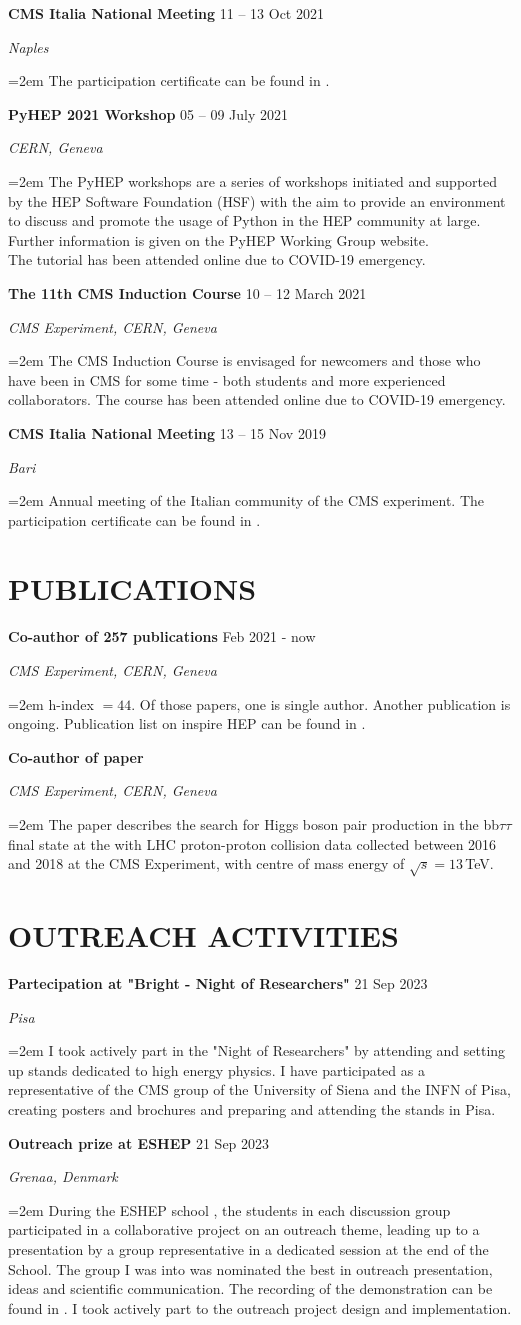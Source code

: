 \documentclass[paper=a4,fontsize=12pt]{article} %
\newcommand{\sepspacesmall}{\vspace*{0.3em}}
\newcommand{\NewPart}[1]{\section*{\uppercase{#1}}}
\newcommand{\EducationEntry}[4]{
	\noindent \textbf{#1} \hfill      %
	{#2} \par  %
	\noindent \textit{#3} \par        %
	\noindent\hangindent=2em\hangafter=0 \small #4 %
	\normalsize \par}
\begin{document}
	\sepspacesmall
	\EducationEntry{CMS Italia National Meeting}{11 -- 13 Oct 2021}{Naples}{The participation certificate can be found in \cite{CMS_it2021}.} 
	\sepspacesmall
	\EducationEntry{PyHEP 2021 Workshop}{05 -- 09 July 2021}{CERN, Geneva}{The PyHEP workshops are a series of workshops initiated and supported by the HEP Software Foundation (HSF) with the aim to provide an environment to discuss and promote the usage of Python in the HEP community at large. Further information is given on the PyHEP Working Group website.\\ The tutorial has been attended online due to COVID-19 emergency. \cite{pyHEP}}
	\sepspacesmall
	\EducationEntry{The 11th CMS Induction Course}{10 -- 12 March 2021}{CMS Experiment, CERN, Geneva}{The CMS Induction Course is envisaged for newcomers and those who have been in CMS for some time - both students and more experienced collaborators. The course has been attended online due to COVID-19 emergency. \cite{induction} }
	\sepspacesmall
	\EducationEntry{CMS Italia National Meeting}{13 -- 15 Nov 2019}{Bari}{Annual meeting of the Italian community of the CMS experiment. The participation certificate can be found in \cite{CMSit_2019}.} 
	\sepspacesmall
	\NewPart{Publications}{} 
    \EducationEntry{Co-author of 257 publications}{Feb 2021 - now}{CMS Experiment, CERN, Geneva}{h-index $=44$. Of those papers, one is single author. Another publication is ongoing. Publication list on inspire HEP can be found in \cite{publications}. \\}
     \sepspacesmall
    \EducationEntry{Co-author of paper}{ }{CMS Experiment, CERN, Geneva}{The paper describes the search for Higgs boson pair production in the bb$\tau\tau$ final state at the with LHC proton-proton collision data collected between 2016 and 2018 at the CMS Experiment, with centre of mass energy of $\sqrt{s} = 13\,$TeV. \cite{bbttananote}}
     \sepspacesmall
\NewPart{Outreach activities}
     \EducationEntry{Partecipation at "Bright - Night of Researchers" }{21 Sep 2023}{Pisa}{I took actively part in the "Night of Researchers" by attending and setting up stands dedicated to high energy physics. I have participated as a representative of the CMS group of the University of Siena and the INFN of Pisa, creating posters and brochures and preparing and attending the stands in Pisa. \cite{bright2023}}
     \sepspacesmall
     \EducationEntry{Outreach prize at ESHEP}{21 Sep 2023}{Grenaa, Denmark}{During the ESHEP school \cite{eshep}, the students in each discussion group participated in a collaborative project on an outreach theme, leading up to a presentation by a group representative in a dedicated session at the end of the School. The group I was into was nominated the best in outreach presentation, ideas and scientific communication. The recording of the demonstration can be found in \cite{neutrinoprese}. I took actively part to the outreach project design and implementation.}
\end{document}
